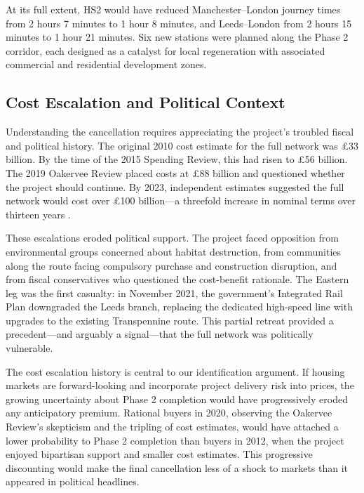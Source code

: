 \documentclass[12pt]{article}
\begin{document}
At its full extent, HS2 would have reduced Manchester--London journey times from 2 hours 7 minutes to 1 hour 8 minutes, and Leeds--London from 2 hours 15 minutes to 1 hour 21 minutes. Six new stations were planned along the Phase 2 corridor, each designed as a catalyst for local regeneration with associated commercial and residential development zones.

\subsection{Cost Escalation and Political Context}

Understanding the cancellation requires appreciating the project's troubled fiscal and political history. The original 2010 cost estimate for the full network was \pounds 33 billion. By the time of the 2015 Spending Review, this had risen to \pounds 56 billion. The 2019 Oakervee Review placed costs at \pounds 88 billion and questioned whether the project should continue. By 2023, independent estimates suggested the full network would cost over \pounds 100 billion---a threefold increase in nominal terms over thirteen years \citep{nao2024hs2}.

These escalations eroded political support. The project faced opposition from environmental groups concerned about habitat destruction, from communities along the route facing compulsory purchase and construction disruption, and from fiscal conservatives who questioned the cost-benefit rationale. The Eastern leg was the first casualty: in November 2021, the government's Integrated Rail Plan downgraded the Leeds branch, replacing the dedicated high-speed line with upgrades to the existing Transpennine route. This partial retreat provided a precedent---and arguably a signal---that the full network was politically vulnerable.

The cost escalation history is central to our identification argument. If housing markets are forward-looking and incorporate project delivery risk into prices, the growing uncertainty about Phase 2 completion would have progressively eroded any anticipatory premium. Rational buyers in 2020, observing the Oakervee Review's skepticism and the tripling of cost estimates, would have attached a lower probability to Phase 2 completion than buyers in 2012, when the project enjoyed bipartisan support and smaller cost estimates. This progressive discounting would make the final cancellation less of a shock to markets than it appeared in political headlines.
\end{document}
